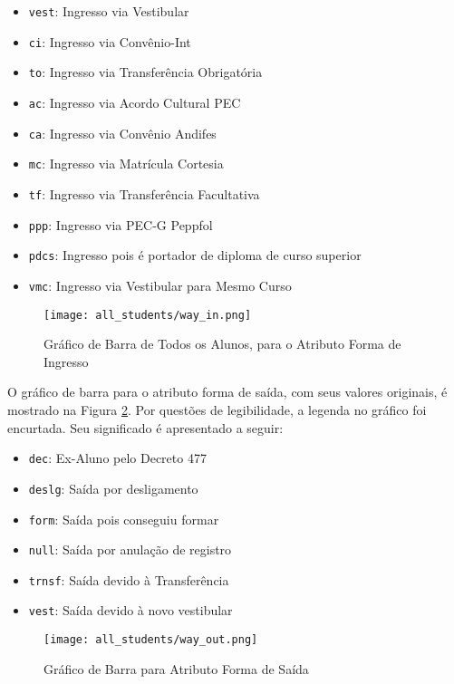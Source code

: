     \begin{itemize}
    \item \texttt{vest}: Ingresso via Vestibular
    \item \texttt{ci}: Ingresso via Convênio-Int
    \item \texttt{to}: Ingresso via Transferência Obrigatória
    \item \texttt{ac}: Ingresso via Acordo Cultural PEC
    \item \texttt{ca}: Ingresso via Convênio Andifes
    \item \texttt{mc}: Ingresso via Matrícula Cortesia
    \item \texttt{tf}: Ingresso via Transferência Facultativa
    \item \texttt{ppp}: Ingresso via PEC-G Peppfol
    \item \texttt{pdcs}: Ingresso pois é portador de diploma de curso superior
    \item \texttt{vmc}: Ingresso via Vestibular para Mesmo Curso
    \end{itemize}

    \begin{figure}[!ht]
    \centering
    \texttt{[image: all\_students/way\_in.png]}
    \caption{Gráfico de Barra de Todos os Alunos, para o Atributo Forma de Ingresso}
    \label{atr_way_in_org}
    \end{figure}

O gráfico de barra para o atributo forma de saída, com seus valores originais, é
mostrado na Figura \ref{atr_way_out_org}. 
Por questões de legibilidade, a legenda no gráfico foi encurtada. Seu significado é
apresentado a seguir: 

    \begin{itemize}
    \item \texttt{dec}: Ex-Aluno pelo Decreto 477
    \item \texttt{deslg}: Saída por desligamento
    \item \texttt{form}: Saída pois conseguiu formar
    \item \texttt{null}: Saída por anulação de registro
    \item \texttt{trnsf}: Saída devido à Transferência
    \item \texttt{vest}: Saída devido à novo vestibular
    \end{itemize}

    \begin{figure}[!ht]
    \centering
    \texttt{[image: all\_students/way\_out.png]}
    \caption{Gráfico de Barra para Atributo Forma de Saída}
    \label{atr_way_out_org}
    \end{figure}


